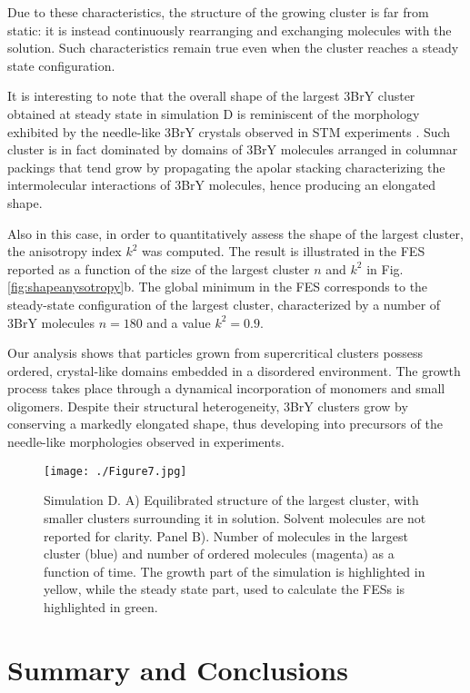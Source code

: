 \documentclass[journal=cgdefu,manuscript=article,layout=twocolumn]{achemso}
\begin{document}
Due to these characteristics, the structure of the growing cluster is far from static: it is instead continuously rearranging and exchanging molecules with the solution.
Such characteristics remain true even when the cluster reaches a steady state configuration. 

It is interesting to note that the overall shape of the largest 3BrY cluster obtained at steady state in simulation D is reminiscent of the morphology exhibited by the needle-like 3BrY crystals observed in STM experiments \cite{harano2012heterogeneous}.
Such cluster is in fact dominated by domains of 3BrY molecules arranged in columnar packings that tend grow by propagating the apolar stacking characterizing the intermolecular interactions of 3BrY molecules, hence producing an elongated shape. 

Also in this case, in order to quantitatively assess the shape of the largest cluster, the anisotropy index $k^2$ was computed.
The result is illustrated in the FES  reported as a function of the size of the largest cluster $n$ and $k^2$ in Fig. \ref{fig:shapeanysotropy}b.
The global minimum in the FES corresponds to the steady-state configuration of the largest cluster, characterized by a number of 3BrY molecules $n=180$ and a value $k^2=0.9$.

Our analysis shows that particles grown from supercritical clusters possess ordered, crystal-like domains embedded in a disordered environment. The growth process takes place through a dynamical incorporation of monomers and small oligomers. Despite their structural heterogeneity, 3BrY clusters grow by conserving a markedly elongated shape, thus developing into precursors of the needle-like morphologies observed in experiments.  


\begin{figure}[ht!]
\centering
\texttt{[image: ./Figure7.jpg]}
\caption{Simulation D. A) Equilibrated structure of the largest cluster, with smaller clusters surrounding it in solution. Solvent molecules are not reported for clarity. Panel B). Number of molecules in the largest cluster (blue) and number of ordered molecules (magenta) as a function of time. The growth part of the simulation is highlighted in yellow, while the steady state part, used to calculate the FESs is highlighted in green.}
\label{fig:3brycluster}
\end{figure}  

\section{Summary and Conclusions}
\end{document}
